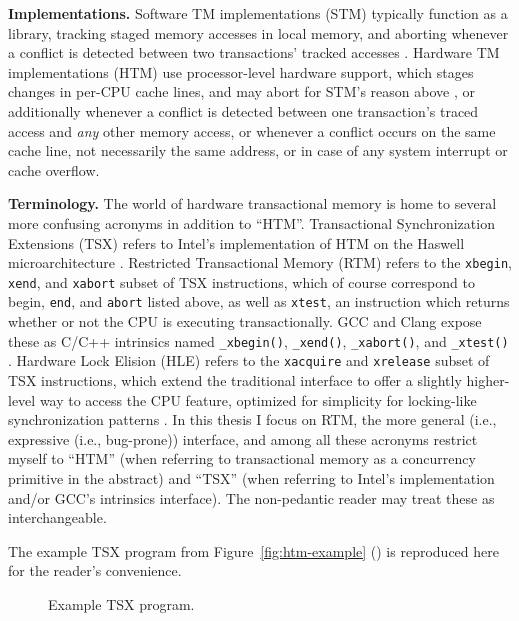 {\bf Implementations.}
Software TM implementations (STM) typically function as a library,
tracking staged memory accesses in local memory,
and aborting whenever a conflict is detected between two transactions' tracked accesses \cite{stm-pldi06}.
Hardware TM implementations (HTM) use processor-level hardware support,
which stages changes in per-CPU cache lines,
and may abort for STM's reason above \cite{htm-experience},
or additionally whenever a conflict is detected between one transaction's traced access and {\em any} other memory access,
or whenever a conflict occurs on the same cache line, not necessarily the same address,
or in case of any system interrupt or cache overflow.

{\bf Terminology.}
The world of hardware transactional memory is home to several more confusing acronyms in addition to ``HTM''.
Transactional Synchronization Extensions (TSX)
refers to Intel's implementation of HTM on the Haswell microarchitecture
\cite{htm-haswell}.
Restricted Transactional Memory (RTM)
refers to the {\tt xbegin}, {\tt xend}, and {\tt xabort} subset of TSX instructions,
which of course correspond to {\sf begin}, {\tt end}, and {\tt abort} listed above,
as well as {\tt xtest}, an instruction which returns whether or not the CPU is executing transactionally.
GCC and Clang expose these as C/C++ intrinsics named {\tt \_xbegin()}, {\tt \_xend()}, {\tt \_xabort()}, and {\tt \_xtest()}
\cite{htm-gcc}.
Hardware Lock Elision (HLE)
refers to the {\tt xacquire} and {\tt xrelease} subset of TSX instructions,
which extend the traditional interface to offer a slightly higher-level way to access the CPU feature,
optimized for simplicity for locking-like synchronization patterns
\cite{hardware-lock-elision}.
In this thesis I focus on RTM, the more general (i.e., expressive (i.e., bug-prone)) interface,
and among all these acronyms restrict myself to ``HTM''
(when referring to transactional memory as a concurrency primitive in the abstract)
and ``TSX''
(when referring to Intel's implementation and/or GCC's intrinsics interface).
The non-pedantic reader may treat these as interchangeable.

The example TSX program from Figure~\ref{fig:htm-example} (\sect{\ref{sec:overview-tm}})
is reproduced here for the reader's convenience.

\begin{figure}[h]
	
	\caption{Example TSX program.}
	\label{fig:htm-example-reproduced}
\end{figure}

